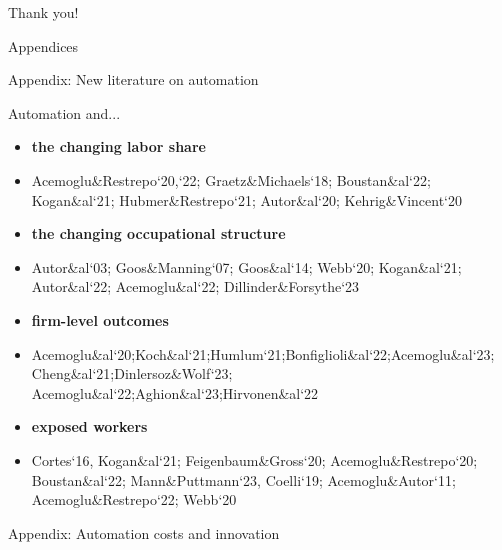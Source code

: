 \documentclass[aspectratio=169]{beamer}
\begin{document}
%
%

\begin{frame}
\begin{center}
{\Large Thank you!}
\end{center}
\end{frame}

\appendix

\begin{frame}
\begin{center}
{\Large Appendices}
\end{center}
\end{frame}

\begin{frame}
\begin{center}
{\Large Appendix: New literature on automation}
\end{center}
\end{frame}

\begin{frame}{Automation and... \hyperlink{literature}{}} \label{otherstudies}
\begin{itemize}
    \item \textbf{the changing labor share} 
    \item[] Acemoglu\&Restrepo`20,`22; Graetz\&Michaels`18; Boustan\&al`22; Kogan\&al`21; Hubmer\&Restrepo`21; Autor\&al`20; Kehrig\&Vincent`20 
    \item \textbf{the changing occupational structure}
    \item[] Autor\&al`03; Goos\&Manning`07; Goos\&al`14; Webb`20; Kogan\&al`21; Autor\&al`22; Acemoglu\&al`22; Dillinder\&Forsythe`23
    \item \textbf{firm-level outcomes}
    \item[] Acemoglu\&al`20;Koch\&al`21;Humlum`21;Bonfiglioli\&al`22;Acemoglu\&al`23; Cheng\&al`21;Dinlersoz\&Wolf`23; Acemoglu\&al`22;Aghion\&al`23;Hirvonen\&al`22
    \item \textbf{exposed workers}
    \item[] Cortes`16, Kogan\&al`21; Feigenbaum\&Gross`20; Acemoglu\&Restrepo`20; Boustan\&al`22; Mann\&Puttmann`23, Coelli`19; Acemoglu\&Autor`11; Acemoglu\&Restrepo`22; Webb`20
\end{itemize} 
\end{frame}

\begin{frame}
\begin{center}
{\Large Appendix: Automation costs and innovation}
\end{center}
\end{frame}
\end{document}
